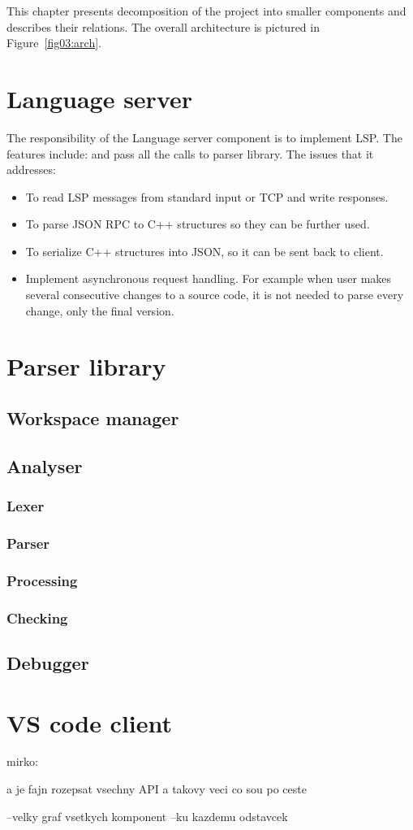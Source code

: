 This chapter presents decomposition of the project into smaller components and describes their relations. The overall architecture is pictured in Figure~\ref{fig03:arch}.

\section{Language server}

The responsibility of the Language server component is to implement LSP. The features include: and pass all the calls to parser library. The issues that it addresses:

\begin{itemize}
    \item To read LSP messages from standard input or TCP and write responses.
    \item To parse JSON RPC to C++ structures so they can be further used.
    \item To serialize C++ structures into JSON, so it can be sent back to client.
    \item Implement asynchronous request handling. For example when user makes several consecutive changes to a source code, it is not needed to parse every change, only the final version.
\end{itemize}

\section{Parser library}

\subsection{Workspace manager}

\subsection{Analyser}

\subsubsection{Lexer}
\subsubsection{Parser}
\subsubsection{Processing}
\subsubsection{Checking}






\subsection{Debugger}



\section{VS code client}

mirko:

a je fajn rozepsat vsechny API a takovy veci co sou po ceste

--velky graf vsetkych komponent
--ku kazdemu odstavcek 